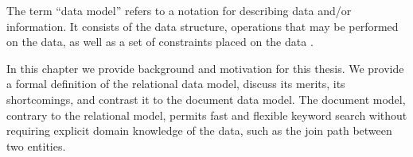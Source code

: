 \label{chap:tale-of-two-data-models}
	The term ``data model'' refers to a notation for describing data and/or information.  It consists of the data structure, operations that may be performed on the data, as well as a set of constraints placed on the data \cite{dbsys-06}.
	
	In this chapter we provide background and motivation for this thesis.  We provide a formal definition of the relational data model, discuss its merits, its shortcomings, and contrast it to the document data model.  The document model, contrary to the relational model, permits fast and flexible keyword search without requiring explicit domain knowledge of the data, such as the join path between two entities.
	
	
	